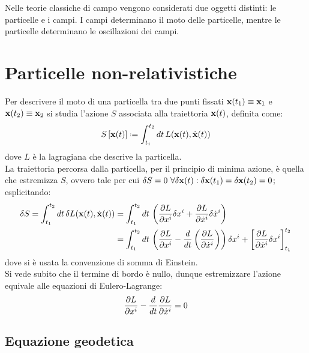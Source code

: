 
Nelle teorie classiche di campo vengono considerati due oggetti distinti: le particelle e i campi. I campi determinano il moto delle particelle, mentre le particelle determinano le oscillazioni dei campi.

\section{Particelle non-relativistiche}

Per descrivere il moto di una particella tra due punti fissati $ \mathbf{x}(t_1) \equiv \mathbf{x}_1 $ e $ \mathbf{x}(t_2) \equiv \mathbf{x}_2 $ si studia l'azione $ S $ associata alla traiettoria $ \mathbf{x}(t) $, definita come:
\begin{equation}
  S\left[ \ve{x}(t) \right] \defeq \int_{t_1}^{t_2} dt\, L(\ve{x}(t),\dot{\ve{x}}(t))
  \label{eq:1.1}
\end{equation}
dove $ L $ è la lagragiana che descrive la particella.\\
La traiettoria percorsa dalla particella, per il principio di minima azione, è quella che estremizza $ S $, ovvero tale per cui $ \delta S = 0 \,\,\forall \delta\mathbf{x}(t) : \delta\mathbf{x}(t_1) = \delta\mathbf{x}(t_2) = 0 $; esplicitando:
\begin{equation}
  \begin{split}
    \delta S = \int_{t_1}^{t_2} dt\, \delta L(\mathbf{x}(t),\dot{\mathbf{x}}(t))
    &= \int_{t_1}^{t_2} dt\, \left( \frac{\partial L}{\partial x^i} \delta x^i + \frac{\partial L}{\partial \dot{x}^i} \delta\dot{x}^i \right)\\
    &= \int_{t_1}^{t_2} dt\, \left( \frac{\partial L}{\partial x^i} - \frac{d}{dt}\left(\frac{\partial L}{\partial \dot{x}^i}\right) \right) \delta{x}^i + \left[ \frac{\partial L}{\partial\dot{x}^i} \delta x^i \right]_{t_1}^{t_2}
  \end{split}
  \label{eq:1.2}
\end{equation}
dove si è usata la convenzione di somma di Einstein.\\
Si vede subito che il termine di bordo è nullo, dunque estremizzare l'azione equivale alle equazioni di Eulero-Lagrange:
\begin{equation}
  \frac{\partial L}{\partial x^i} - \frac{d}{dt} \frac{\partial L}{\partial \dot{x}^i} = 0
  \label{eq:1.3}
\end{equation}

\subsection{Equazione geodetica}


